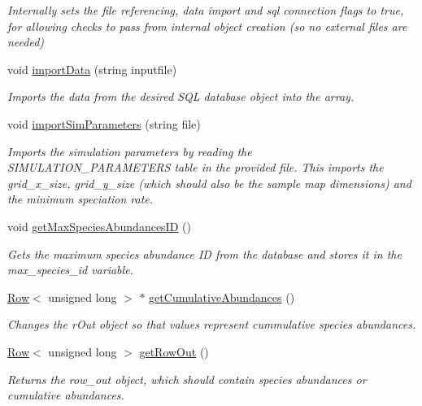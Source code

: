 \begin{DoxyCompactItemize}
\begin{DoxyCompactList}\small\item\em Internally sets the file referencing, data import and sql connection flags to true, for allowing checks to pass from internal object creation (so no external files are needed) \end{DoxyCompactList}\item 
void \hyperlink{class_community_a85db7255d3a1d53509ed2800fc24de31}{import\+Data} (string inputfile)
\begin{DoxyCompactList}\small\item\em Imports the data from the desired S\+QL database object into the array. \end{DoxyCompactList}\item 
void \hyperlink{class_community_a548d36e99e592f0bfc09c8315b27f8bb}{import\+Sim\+Parameters} (string file)
\begin{DoxyCompactList}\small\item\em Imports the simulation parameters by reading the S\+I\+M\+U\+L\+A\+T\+I\+O\+N\+\_\+\+P\+A\+R\+A\+M\+E\+T\+E\+RS table in the provided file. This imports the grid\+\_\+x\+\_\+size, grid\+\_\+y\+\_\+size (which should also be the sample map dimensions) and the minimum speciation rate. \end{DoxyCompactList}\item 
void \hyperlink{class_community_a8ac0ce642595283f342c2f1841f4c20f}{get\+Max\+Species\+Abundances\+ID} ()
\begin{DoxyCompactList}\small\item\em Gets the maximum species abundance ID from the database and stores it in the max\+\_\+species\+\_\+id variable. \end{DoxyCompactList}\item 
\hyperlink{class_row}{Row}$<$ unsigned long $>$ $\ast$ \hyperlink{class_community_a51d90183f6a26e7d192abfd748945f2b}{get\+Cumulative\+Abundances} ()
\begin{DoxyCompactList}\small\item\em Changes the r\+Out object so that values represent cummulative species abundances. \end{DoxyCompactList}\item 
\hyperlink{class_row}{Row}$<$ unsigned long $>$ \hyperlink{class_community_a63fd8d32af6d52d009d1fd54098e4594}{get\+Row\+Out} ()
\begin{DoxyCompactList}\small\item\em Returns the row\+\_\+out object, which should contain species abundances or cumulative abundances. \end{DoxyCompactList}\item 

\end{DoxyCompactItemize}
